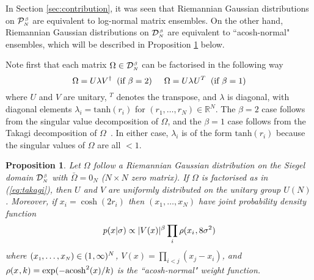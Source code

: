 \documentclass[draftclsnofoot]{IEEEtran}
\newtheorem{prop}{Proposition}
\begin{document}
In Section \ref{sec:contribution}, it was seen that Riemannian Gaussian distributions on $\mathcal{P}^{\hspace{0.02cm}\scriptscriptstyle \beta}_{\scriptscriptstyle N}$ are equivalent to log-normal matrix ensembles. On the other hand, Riemannian Gaussian distributions on $\mathcal{D}^{\hspace{0.02cm}\scriptscriptstyle \beta}_{\scriptscriptstyle N}$ are equivalent to ``acosh-normal" ensembles, which will be described in Proposition \ref{prop:acosh} below. 

Note first that each matrix $\Omega \in \mathcal{D}^{\hspace{0.02cm}\scriptscriptstyle \beta}_{\scriptscriptstyle N}$ 
can be factorised in the following way
\begin{equation} \label{eq:takagi}
 \Omega = U\lambda V^\dagger \;\; (\text{if } \beta = 2) \hspace{0.5cm}
 \Omega = U\lambda\hspace{0.02cm}U^T \;\;(\text{if } \beta = 1)
\end{equation}
where $U$ and $V$ are unitary, $^T$ denotes the transpose, and $\lambda$ is diagonal, with diagonal elements $\lambda_ i =  \mathrm{tanh}(r_i)$ for $(r_{\scriptscriptstyle 1},\ldots,r_{\scriptscriptstyle N}) \in \mathbb{R}^N$. The $\beta = 2$ case follows from the singular value decomposition of $\Omega$, and the $\beta = 1$ case follows from the Takagi decomposition of $\Omega$~\cite{edelman}. In either case, $\lambda_ i$ is of the form $\mathrm{tanh}(r_i)$ because the singular values of $\Omega$ are all $< 1$.
\begin{prop} \label{prop:acosh}
  Let $\Omega$ follow a Riemannian Gaussian distribution on the Siegel domain $\mathcal{D}^{\hspace{0.02cm}\scriptscriptstyle \beta}_{\scriptscriptstyle N}$ with $\bar{\Omega} = \mathrm{0}_{\scriptscriptstyle N}$ ($N \times N$ zero matrix). If $\Omega$ is factorised as in (\ref{eq:takagi}), then $U$ and $V$ are uniformly distributed on the unitary group $U(N)$. Moreover, if $x_i = \cosh(2r_i)$ then $(x_{\scriptscriptstyle 1},\ldots,x_{\scriptscriptstyle N})$ have joint probability density function 
 \begin{equation} \label{eq:acoshnormal2}
  p(x|\sigma) \propto |V(x)|^\beta\prod_i \rho(x_i\hspace{0.02cm},8\sigma^2)  
\end{equation}
where $(x_{\scriptscriptstyle 1},\ldots,x_{\scriptscriptstyle N}) \in (1\hspace{0.02cm},\infty)^N$, $V(x) = \prod_{i<j}(x_j-x_i)$, and $\rho(x\hspace{0.02cm},k) = \exp(-\mathrm{acosh}^2(x)/k)$ is the ``acosh-normal" weight function.
\end{prop}
\end{document}
